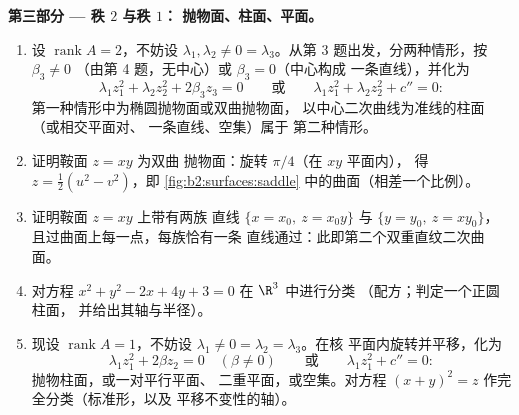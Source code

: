 \begin{problem}
\medskip
\noindent\textbf{第三部分 --- 秩 $2$ 与秩 $1$：
抛物面、柱面、平面。}
\begin{enumerate}[resume]
  \item 设 $\operatorname{rank}A = 2$，不妨设 $\lambda_1,
        \lambda_2 \neq 0 = \lambda_3$。从第
        3 题出发，分两种情形，按 $\beta_3 \neq 0$
        （由第 4 题，无中心）或 $\beta_3 = 0$（中心构成
        一条直线），并化为
        \[
        \lambda_1z_1^2 + \lambda_2z_2^2 + 2\beta_3z_3 = 0
        \qquad\text{或}\qquad
        \lambda_1z_1^2 + \lambda_2z_2^2 + c'' = 0 :
        \]
        第一种情形中为椭圆抛物面或双曲抛物面，
        以中心二次曲线为准线的柱面（或相交平面对、
        一条直线、空集）属于
        第二种情形。
  \item 证明鞍面 $z = xy$ 为双曲
        抛物面：旋转 $\pi/4$（在 $xy$ 平面内），
        得 $z = \tfrac12(u^2 - v^2)$，即
        \cref{fig:b2:surfaces:saddle} 中的曲面（相差一个比例）。
  \item 证明鞍面 $z = xy$ 上带有两族
        直线 $\{x = x_0,\ z = x_0y\}$ 与 $\{y = y_0,\ z
        = xy_0\}$，且过曲面上每一点，每族恰有一条
        直线通过：此即第二个双重直纹二次曲面。
  \item 对方程 $x^2 + y^2 - 2x + 4y + 3 = 0$ 在 $\R^3$ 中进行分类
        （配方；判定一个正圆柱面，
        并给出其轴与半径）。
  \item 现设 $\operatorname{rank}A = 1$，不妨设 $\lambda_1
        \neq 0 = \lambda_2 = \lambda_3$。在核
        平面内旋转并平移，化为
        \[
        \lambda_1z_1^2 + 2\beta z_2 = 0 \quad (\beta \neq 0)
        \qquad\text{或}\qquad
        \lambda_1z_1^2 + c'' = 0 :
        \]
        抛物柱面，或一对平行平面、
        二重平面，或空集。对方程 $(x + y)^2 =
        z$ 作完全分类（标准形，以及
        平移不变性的轴）。
\end{enumerate}


\end{problem}
